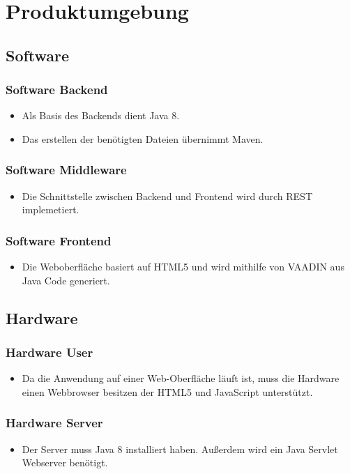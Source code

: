 \section{Produktumgebung}

\subsection{Software}
\subsubsection{Software Backend}
\begin{itemize}
    \item Als Basis des Backends dient Java 8.
    \item Das erstellen der benötigten Dateien übernimmt Maven.
\end{itemize}

\subsubsection{Software Middleware}
\begin{itemize}
    \item Die Schnittstelle zwischen Backend und Frontend wird durch REST implemetiert.
\end{itemize}

\subsubsection{Software Frontend}
\begin{itemize}
    \item Die Weboberfläche basiert auf HTML5 und wird mithilfe von VAADIN aus Java Code generiert.
\end{itemize}

\subsection{Hardware}
\subsubsection{Hardware User}
\begin{itemize}
    \item Da die Anwendung auf einer Web-Oberfläche läuft ist, muss die Hardware einen Webbrowser besitzen der HTML5 und JavaScript unterstützt.
\end{itemize}

\subsubsection{Hardware Server}
\begin{itemize}
    \item  Der Server muss Java 8 installiert haben.
    Außerdem wird ein Java Servlet Webserver benötigt.
\end{itemize}